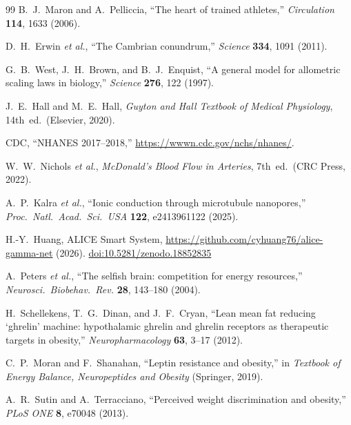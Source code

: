 \documentclass[aps,pre,twocolumn,superscriptaddress,floatfix]{revtex4-2}
\begin{document}
\begin{thebibliography}{99}
B.~J.~Maron and A.~Pelliccia,
``The heart of trained athletes,''
\emph{Circulation} \textbf{114}, 1633 (2006).

D.~H.~Erwin \emph{et al.}, ``The Cambrian conundrum,''
\emph{Science} \textbf{334}, 1091 (2011).

G.~B.~West, J.~H.~Brown, and B.~J.~Enquist,
``A general model for allometric scaling laws in biology,''
\emph{Science} \textbf{276}, 122 (1997).

J.~E.~Hall and M.~E.~Hall, \emph{Guyton and Hall Textbook of
Medical Physiology}, 14th~ed.\ (Elsevier, 2020).

CDC, ``NHANES 2017--2018,''
\url{https://wwwn.cdc.gov/nchs/nhanes/}.

W.~W.~Nichols \emph{et al.}, \emph{McDonald's Blood Flow in
Arteries}, 7th~ed.\ (CRC Press, 2022).

A.~P.~Kalra \emph{et al.}, ``Ionic conduction through
microtubule nanopores,'' \emph{Proc.\ Natl.\ Acad.\ Sci.\
USA} \textbf{122}, e2413961122 (2025).

H.-Y.~Huang, ALICE Smart System,
\url{https://github.com/cyhuang76/alice-gamma-net} (2026).
\href{https://doi.org/10.5281/zenodo.18852835}{doi:10.5281/zenodo.18852835}

A.~Peters \emph{et al.}, ``The selfish brain: competition
for energy resources,''
\emph{Neurosci.\ Biobehav.\ Rev.} \textbf{28}, 143--180
(2004).

H.~Schellekens, T.~G.~Dinan, and J.~F.~Cryan,
``Lean mean fat reducing `ghrelin' machine: hypothalamic
ghrelin and ghrelin receptors as therapeutic targets in
obesity,''
\emph{Neuropharmacology} \textbf{63}, 3--17 (2012).

C.~P.~Moran and F.~Shanahan,
``Leptin resistance and obesity,''
in \emph{Textbook of Energy Balance, Neuropeptides and
Obesity} (Springer, 2019).

A.~R.~Sutin and A.~Terracciano,
``Perceived weight discrimination and obesity,''
\emph{PLoS ONE} \textbf{8}, e70048 (2013).

\end{thebibliography}
\end{document}
